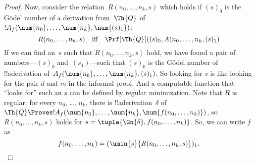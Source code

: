 \documentclass[../../../include/open-logic-section]{subfiles}
\begin{document}
\begin{proof}
Now, consider the relation~$R(n_0, \dots, n_k, s)$ which holds if
$(s)_0$ is the G\"odel number of a derivation from~$\Th{Q}$ of
$!A_f(\num{n_0}, \dots, \num{n_k}, \num{(s)_1})$:
\[
R(n_0, \dots, n_k, s) \quad\text{iff}\quad \Prf[\Th{Q}]((s)_0, A(n_0,
\dots, n_k, (s)_1)
\]
If we can find an~$s$ such that $R(n_0, \dots, n_k, s)$ hold, we have
found a pair of numbers---$(s)_0$ and~$(s_1)$---such that $(s)_0$ is
the G\"odel number of !!a{derivation} of~$A_f(\num{n_0}, \dots,
\num{n_k}, (s)_1)$. So looking for $s$ is like looking for the pair
$d$ and $m$ in the informal proof.  And a computable function that
``looks for'' such an $s$ can be defined by regular minimization.
Note that $R$ is regular: for every $n_0$, \dots, $n_k$, there is
!!a{derivation}~$\delta$ of $\Th{Q} \Proves !A_f(\num{n_0}, \dots,
\num{n_k}, \num{f(n_0, \dots, n_k)})$, so $R(n_0, \dots, n_k, s)$
holds for $s = \tuple{\Gn{\delta}, f(n_0, \dots, n_k)}$.  So, we can
write $f$ as
\[
f(n_0,\dots,n_{k}) = (\umin{s}{R(n_0, \dots, n_k, s)})_1.
\]
\end{proof}
\end{document}
